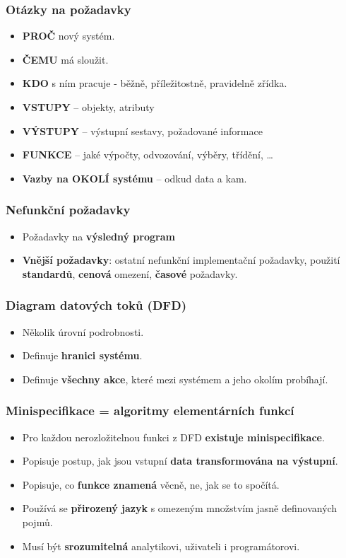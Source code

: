 \subsubsection*{Otázky na požadavky}
\begin{itemize}
\item\textbf{PROČ} nový systém. 
\item\textbf{ČEMU} má sloužit. 
\item\textbf{KDO} s ním pracuje - běžně, příležitostně, pravidelně zřídka. 
\item\textbf{VSTUPY} – objekty, atributy 
\item\textbf{VÝSTUPY} – výstupní sestavy, požadované informace 
\item\textbf{FUNKCE} – jaké výpočty, odvozování, výběry, třídění, \ldots
\item\textbf{Vazby na OKOLÍ systému} – odkud data a kam.
\end{itemize}

\subsubsection*{Nefunkční požadavky}
\begin{itemize}
\item Požadavky na \textbf{výsledný program}
\item \textbf{Vnější požadavky}: ostatní nefunkční implementační požadavky, použití \textbf{standardů}, \textbf{cenová} omezení, \textbf{časové} požadavky.
\end{itemize}

\subsubsection*{Diagram datových toků (DFD)}
\begin{itemize}
\item Několik úrovní podrobnosti.
\item Definuje\textbf{ hranici systému}.
\item Definuje \textbf{všechny akce}, které mezi systémem a jeho okolím probíhají.
\end{itemize}

\subsubsection*{Minispecifikace = algoritmy elementárních funkcí}
\begin{itemize}
\item Pro každou nerozložitelnou funkci z DFD \textbf{existuje minispecifikace}.
\item Popisuje postup, jak jsou vstupní \textbf{data transformována na výstupní}.
\item Popisuje, co \textbf{funkce znamená} věcně, ne, jak se to spočítá.
\item Používá se \textbf{přirozený jazyk} s omezeným množstvím jasně definovaných pojmů.
\item Musí být \textbf{srozumitelná} analytikovi, uživateli i programátorovi.
\end{itemize}


